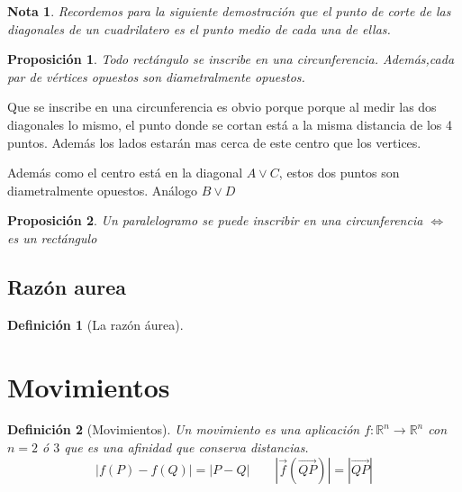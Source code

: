 \documentclass[11pt, a4paper, titlepage]{article}
\makeatletter
\renewenvironment{proof}[1][\proofname] {\vspace{-15pt}\par\pushQED{\qed}\normalfont\topsep6\p@\@plus6\p@\relax\trivlist\item[\hskip\labelsep\it#1\@addpunct{.}]\ignorespaces}{\popQED\endtrivlist\@endpefalse}
\newcommand{\R}{\mathbb{R}}
\renewcommand{\vec}{\overrightarrow}
\renewenvironment{proof}[1][\proofname] {\par\pushQED{\qed}\normalfont\topsep6\p@\@plus6\p@\relax\trivlist\item[\hskip\labelsep\itshape\sffamily#1\@addpunct{.}]\ignorespaces}{\popQED\endtrivlist\@endpefalse}
\theoremstyle{theorem-style}
\newtheorem{nprop}{Proposición}[section]
\theoremstyle{definition-style}
\newtheorem{ndef}{Definición}[section]
\theoremstyle{remark-style}
\newtheorem*{nota}{Nota}
\theoremstyle{example-style}
\makeatother
\begin{document}
\begin{nota}
	Recordemos para la siguiente demostración que el punto de corte de las diagonales de un cuadrilatero es el punto medio de cada una de ellas.
\end{nota}

\begin{nprop}
  Todo rectángulo se inscribe en una circunferencia. Además,cada par de vértices opuestos son diametralmente opuestos.
\end{nprop}

\begin{proof}
	Que se inscribe en una circunferencia es obvio porque porque al medir las dos diagonales lo mismo, el punto donde se cortan está a la misma distancia de los 4 puntos. Además los lados estarán mas cerca de este centro que los vertices. 
	
	Además como el centro está en la diagonal $A\vee C$, estos dos puntos son diametralmente opuestos. Análogo $B\vee D$
\end{proof}

\begin{nprop}
  Un paralelogramo se puede inscribir en una circunferencia $\iff$ es un rectángulo
\end{nprop}





\subsection {Razón aurea}
\begin{ndef}[La razón áurea]
  
\end{ndef}











\section{Movimientos}

\begin{ndef}[Movimientos]
  Un movimiento es una aplicación $f:\R^n \to \R^n$ con $n= 2$ ó $3$ que es una afinidad que conserva distancias.
  \[
    |f(P)-f(Q)|= |P-Q| \quad  \quad |\vec{f}(\vec{QP})|= |\vec{QP}|
  \]
\end{ndef}
\end{document}
